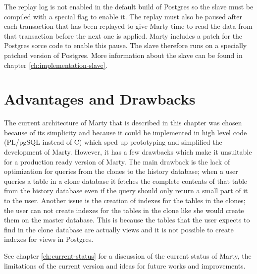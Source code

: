The replay log is not enabled in the default build of Postgres so the slave must be compiled with a special flag to enable it.
The replay must also be paused after each transaction that has been replayed to give Marty time to read the data from that transaction before the next one is applied.
Marty includes a patch for the Postgres sorce code to enable this pause.
The slave therefore runs on a specially patched version of Postgres.
More information about the slave can be found in chapter \ref{ch:implementation-slave}.

\section{Advantages and Drawbacks}
The current architecture of Marty that is described in this chapter was chosen because of its simplicity and because it could be implemented in high level code (PL/pgSQL instead of C) which sped up prototyping and simplified the development of Marty.
However, it has a few drawbacks which make it unsuitable for a production ready version of Marty.
The main drawback is the lack of optimization for queries from the clones to the history database; when a user queries a table in a clone database it fetches the complete contents of that table from the history database even if the query should only return a small part of it to the user.
Another issue is the creation of indexes for the tables in the clones; the user can not create indexes for the tables in the clone like she would create them on the master database.
This is because the tables that the user expects to find in the clone database are actually views and it is not possible to create indexes for views in Postgres.

See chapter \ref{ch:current-status} for a discussion of the current status of Marty, the limitations of the current version and ideas for future works and improvements.
